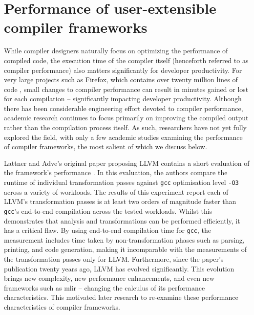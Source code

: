 \section{Performance of user-extensible compiler frameworks}
\label{sec:perf-user-extensible-frameworks}

While compiler designers naturally focus on optimizing the performance of compiled code, the execution time of the compiler itself (henceforth referred to as compiler performance) also matters significantly for developer productivity.
For very large projects such as Firefox, which contains over twenty million lines of code \cite{bastienabadieEngineeringCodeQuality}, small changes to compiler performance can result in minutes gained or lost for each compilation -- significantly impacting developer productivity. Although there has been considerable engineering effort devoted to compiler performance, academic research continues to focus primarily on improving the compiled output rather than the compilation process itself.
As such, researchers have not yet fully explored the field, with only a few academic studies examining the performance of compiler frameworks, the most salient of which we discuss below.

Lattner and Adve's original paper proposing LLVM contains a short evaluation of the framework's performance \cite[Section 4.1.4]{lattnerLLVMCompilationFramework2004}.
In this evaluation, the authors compare the runtime of individual transformation passes against \texttt{gcc} optimisation level \texttt{-O3} across a variety of workloads.
The results of this experiment \cite[Table 2]{lattnerLLVMCompilationFramework2004} report each of LLVM's transformation passes is at least two orders of magnitude faster than \texttt{gcc}'s end-to-end compilation across the tested workloads. Whilst this demonstrates that analysis and transformations can be performed efficiently, it has a critical flaw. By using end-to-end compilation time for \texttt{gcc}, the measurement includes time taken by non-transformation phases such as parsing, printing, and code generation, making it incomparable with the measurements of the transformation passes only for LLVM.
Furthermore, since the paper's publication twenty years ago, LLVM has evolved significantly. This evolution brings new complexity, new performance enhancements, and even new frameworks such as \ac{mlir} -- changing the calculus of its performance characteristics.
This motivated later research to re-examine these performance characteristics of compiler frameworks.

